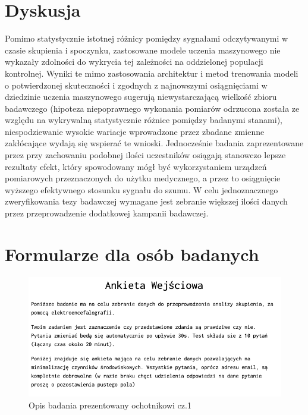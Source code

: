 \documentclass{./assets/wfis}
\begin{document}



\chapter{Dyskusja}\label{dyskusja}
Pomimo statystycznie istotnej różnicy pomiędzy sygnałami odczytywanymi w czasie skupienia i spoczynku, zastosowane modele uczenia maszynowego nie wykazały zdolności do wykrycia tej zależności na oddzielonej populacji kontrolnej. Wyniki te mimo zastosowania architektur \cite{} i metod trenowania modeli \cite{} o potwierdzonej skuteczności i zgodnych z najnowszymi osiągnięciami w dziedzinie uczenia maszynowego sugerują niewystarczającą wielkość zbioru badawczego (hipoteza niepoprawnego wykonania pomiarów odrzucona została ze względu na wykrywalną statystycznie różnice pomiędzy badanymi stanami), niespodziewanie wysokie wariacje wprowadzone przez zbadane zmienne zakłócające wydają się wspierać te wnioski. Jednocześnie badania zaprezentowane przez \cite{} przy zachowaniu podobnej ilości uczestników osiągają stanowczo lepsze rezultaty efekt, który spowodowany mógł być wykorzystaniem urządzeń pomiarowych przeznaczonych do użytku medycznego, a przez to osiągnięcie wyższego efektywnego stosunku sygnału do szumu. W celu jednoznacznego zweryfikowania tezy badawczej wymagane jest zebranie większej ilości danych przez przeprowadzenie dodatkowej kampanii badawczej.

\printbibliography

\clearpage
\listoffigures
\clearpage
\listoftables
\clearpage

\appendix
\chapter{Formularze dla osób badanych}\label{formularz-dla-osoby-badanej}

\begin{figure}[h!]
    \centering
    \includegraphics[width=\columnwidth]{thesis/assets/description_2.png}
    \caption{Opis badania prezentowany ochotnikowi cz.1}
    \label{formularz-dla-osoby-badanej}
\end{figure}
\end{document}
